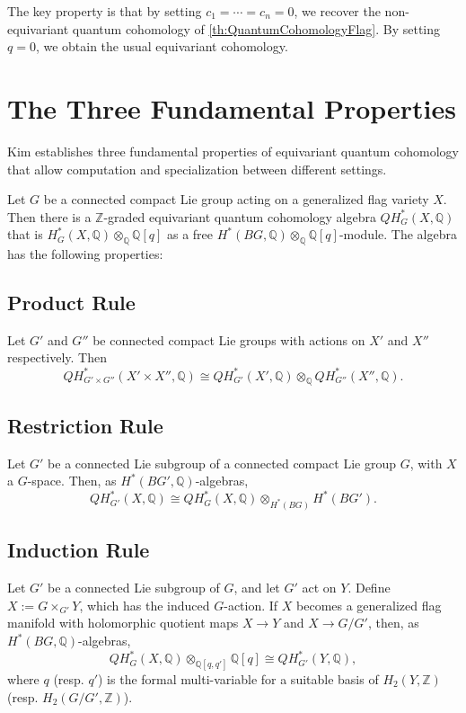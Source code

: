 The key property is that by setting $c_1 = \cdots = c_n = 0$, we recover the non-equivariant quantum cohomology of \cref{th:QuantumCohomologyFlag}. By setting $q = 0$, we obtain the usual equivariant cohomology.

\section{The Three Fundamental Properties}

Kim establishes three fundamental properties of equivariant quantum cohomology that allow computation and specialization between different settings.

\begin{Lemma}
\label{lma:ThreeProperties}
Let $G$ be a connected compact Lie group acting on a generalized flag variety $X$. Then there is a $\mathbb{Z}$-graded equivariant quantum cohomology algebra $QH_G^*(X, \mathbb{Q})$ that is $H_G^*(X, \mathbb{Q}) \otimes_{\mathbb{Q}} \mathbb{Q}[q]$ as a free $H^*(BG, \mathbb{Q}) \otimes_{\mathbb{Q}} \mathbb{Q}[q]$-module. The algebra has the following properties:

\subsection{Product Rule}
Let $G'$ and $G''$ be connected compact Lie groups with actions on $X'$ and $X''$ respectively. Then
\begin{equation}
QH_{G' \times G''}^*(X' \times X'', \mathbb{Q}) \cong QH_{G'}^*(X', \mathbb{Q}) \otimes_{\mathbb{Q}} QH_{G''}^*(X'', \mathbb{Q}).
\label{eq:product-rule}
\end{equation}

\subsection{Restriction Rule}
Let $G'$ be a connected Lie subgroup of a connected compact Lie group $G$, with $X$ a $G$-space. Then, as $H^*(BG', \mathbb{Q})$-algebras,
\begin{equation}
QH_{G'}^*(X, \mathbb{Q}) \cong QH_G^*(X, \mathbb{Q}) \otimes_{H^*(BG)} H^*(BG').
\label{eq:restriction-rule}
\end{equation}

\subsection{Induction Rule}
Let $G'$ be a connected Lie subgroup of $G$, and let $G'$ act on $Y$. Define $X := G \times_{G'} Y$, which has the induced $G$-action. If $X$ becomes a generalized flag manifold with holomorphic quotient maps $X \to Y$ and $X \to G/G'$, then, as $H^*(BG, \mathbb{Q})$-algebras,
\begin{equation}
QH_G^*(X, \mathbb{Q}) \otimes_{\mathbb{Q}[q, q']} \mathbb{Q}[q] \cong QH_{G'}^*(Y, \mathbb{Q}),
\label{eq:induction-rule}
\end{equation}
where $q$ (resp. $q'$) is the formal multi-variable for a suitable basis of $H_2(Y, \mathbb{Z})$ (resp. $H_2(G/G', \mathbb{Z})$).
\end{Lemma}

